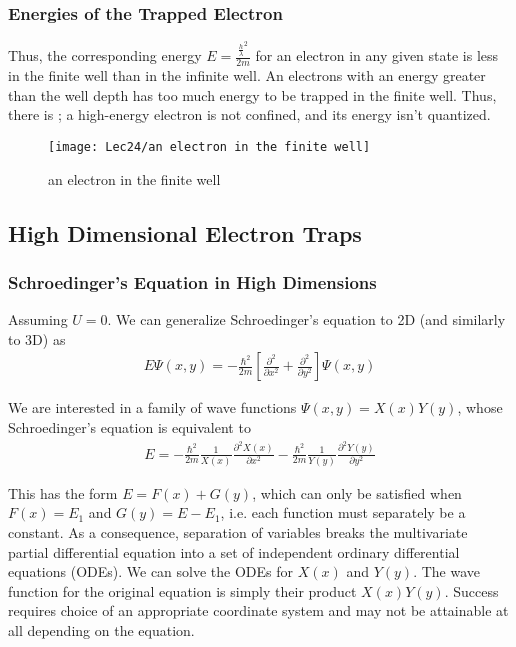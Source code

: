 \subsubsection{Energies of the Trapped Electron}
Thus, the corresponding energy $E=\frac{\frac{h}{\lambda}^2}{2m}$ for an electron in any given state is less in the finite well than in the infinite well. An electrons with an energy greater than the well depth has too much energy to be trapped in the finite well. Thus, there is ; a high-energy electron is not confined, and its energy isn't quantized. 

\begin{figure}[H]
    \centering
    \texttt{[image: Lec24/an electron in the finite well]}
    \caption{an electron in the finite well}
\end{figure}

\subsection{High Dimensional Electron Traps}

\subsubsection{Schroedinger's Equation in High Dimensions}
Assuming $U=0$. We can generalize Schroedinger's equation to 2D (and similarly to 3D) as 
\begin{align*}
    E\Psi(x,y)=-\frac{\hbar^2}{2m}\left[ \frac{\partial^2}{\partial x^2}+\frac{\partial^2}{\partial y^2} \right]\Psi(x,y)
\end{align*}

We are interested in a family of wave functions $\Psi(x,y)=X(x)Y(y)$, whose Schroedinger's equation is equivalent to 
\begin{align*}
    E=-\frac{\hbar^2}{2m}\frac{1}{X(x)}\frac{\partial^2 X(x)}{\partial x^2}-\frac{\hbar^2}{2m}\frac{1}{Y(y)}\frac{\partial^2 Y(y)}{\partial y^2}
\end{align*}

This has the form $E=F(x)+G(y)$, which can only be satisfied when $F(x)=E_1$ and $G(y)=E-E_1$, i.e. each function must separately be a constant. As a consequence, separation of variables breaks the multivariate partial differential equation into a set of independent ordinary differential equations (ODEs). We can solve the ODEs for $X (x )$ and $Y (y )$. The wave function for the original equation is simply their product $X (x )Y (y )$. Success requires choice of an appropriate coordinate system and may not be attainable at all depending on the equation.

